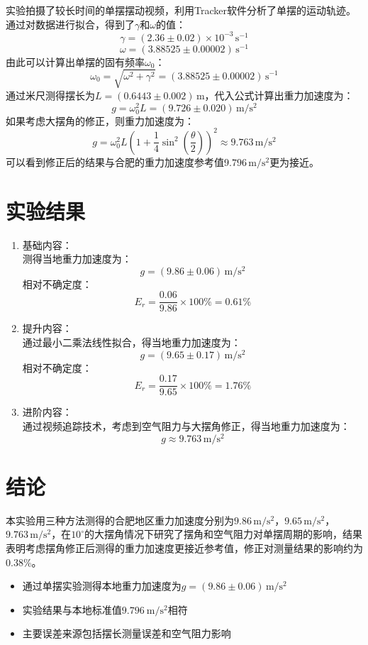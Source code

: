 \documentclass[12pt,a4paper]{article}
\begin{document}
        实验拍摄了较长时间的单摆摆动视频，利用Tracker软件分析了单摆的运动轨迹。通过对数据进行拟合，得到了$\gamma$和$\omega$的值：\\
        \[\gamma=(2.36\pm 0.02)\times 10^{-3}\,\mathrm{s^{-1}}\]
        \[\omega=(3.88525\pm 0.00002)\,\mathrm{s^{-1}}\]
        由此可以计算出单摆的固有频率$\omega_0$：
        \[
            \omega_0=\sqrt{\omega^2+\gamma^2}=(3.88525\pm 0.00002)\,\mathrm{s^{-1}}
        \]
        通过米尺测得摆长为$L=(0.6443\pm 0.002)\,\mathrm{m}$，代入公式计算出重力加速度为：
        \[
            g=\omega_0^2L=(9.726\pm 0.020)\,\mathrm{m/s^2}
        \]
        如果考虑大摆角的修正，则重力加速度为：
        \[
            g=\omega_0^2L\left(1+\frac{1}{4}\sin^2\left(\frac{\theta}{2}\right)\right)^2\approx 9.763\,\mathrm{m/s^2}
        \]
        可以看到修正后的结果与合肥的重力加速度参考值$9.796\,\mathrm{m/s^2}$更为接近。

    \section{实验结果}
        \begin{enumerate}
            \item 基础内容： \\
            测得当地重力加速度为：
            \[
                g=\left(9.86 \pm 0.06\right)\,\mathrm{m/s^2}
            \]
            相对不确定度：
            \[
                E_r = \frac{0.06}{9.86} \times 100\% = 0.61\%
            \]

            \item 提升内容： \\
            通过最小二乘法线性拟合，得当地重力加速度为：
            \[
                g=\left(9.65 \pm 0.17\right)\,\mathrm{m/s^2}
            \]
            相对不确定度：
            \[
                E_r = \frac{0.17}{9.65} \times 100\% = 1.76\%
            \]

            \item 进阶内容： \\
            通过视频追踪技术，考虑到空气阻力与大摆角修正，得当地重力加速度为：
            \[
                g\approx 9.763\,\mathrm{m/s^2}
            \]
        \end{enumerate}

    \section{结论}
        本实验用三种方法测得的合肥地区重力加速度分别为$9.86\,\mathrm{m/s^2}$，$9.65\,\mathrm{m/s^2}$，$9.763\,\mathrm{m/s^2}$，在$10^\circ$的大摆角情况下研究了摆角和空气阻力对单摆周期的影响，结果表明考虑摆角修正后测得的重力加速度更接近参考值，修正对测量结果的影响约为0.38\%。
        \begin{itemize}
            \item 通过单摆实验测得本地重力加速度为$g=\left(9.86 \pm 0.06\right)\,\mathrm{m/s^2}$
            \item 实验结果与本地标准值$9.796\ \mathrm{m/s^2}$相符
            \item 主要误差来源包括摆长测量误差和空气阻力影响
        \end{itemize}
\end{document}
